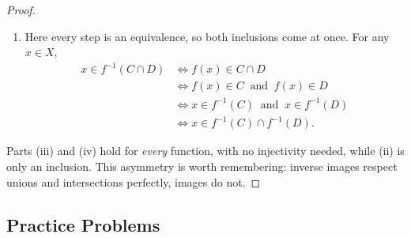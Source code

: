 \documentclass[11pt,a4paper]{article}
\theoremstyle{definition}
\begin{document}
\begin{proof}
\begin{enumerate}
Conversely, suppose $x\in f^{-1}(C)\cup f^{-1}(D)$, so $x\in f^{-1}(C)$ or
$x\in f^{-1}(D)$, and therefore $f(x)\in C$ or $f(x)\in D$. This means
$f(x)\in C\cup D$, so $x\in f^{-1}(C\cup D)$. Thus
$f^{-1}(C)\cup f^{-1}(D)\subset f^{-1}(C\cup D)$, and the two sets are equal.

\item Here every step is an equivalence, so both inclusions come at once. For
any $x\in X$,
\begin{align*}
x\in f^{-1}(C\cap D) &\iff f(x)\in C\cap D\\
                     &\iff f(x)\in C \ \text{ and }\ f(x)\in D\\
                     &\iff x\in f^{-1}(C) \ \text{ and }\ x\in f^{-1}(D)\\
                     &\iff x\in f^{-1}(C)\cap f^{-1}(D).
\end{align*}
\end{enumerate}
Parts (iii) and (iv) hold for \emph{every} function, with no injectivity
needed, while (ii) is only an inclusion. This asymmetry is worth remembering:
inverse images respect unions and intersections perfectly, images do not.
\end{proof}

\subsection{Practice Problems}
\end{document}
